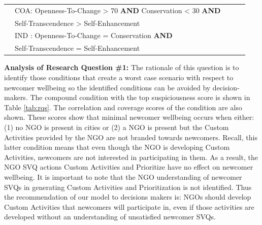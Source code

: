 \documentclass{scspaperproc}
\theoremstyle{scsthe}
\begin{document}
\begin{table}[ht]
\begin{center}
{\begin{tabular}{|l l l l l |}
                                                                      & COA: Openness-To-Change > 70 \textbf{AND} Conservation < 30 \textbf{AND} & & & \\         
                                                                      &  \hspace*{0.95cm} Self-Transcendence > Self-Enhancement  & & & \\  
                                                                      & IND : Openness-To-Change = Conservation \textbf{AND} & & & \\         
                                                                      &  \hspace*{0.95cm} Self-Transcendence = Self-Enhancement & & & \\    
\hline
\end{tabular}}
\end{center}
\end{table}
 
{\bf Analysis of Research Question \#1:} The rationale of this question is to identify those conditions that create a worst case scenario with respect to newcomer wellbeing so the identified conditions can be avoided by decision-makers. The compound condition with the top suspiciousness score is shown in Table \ref{tab:rqs}. The correlation and coverage scores of the condition are also shown. These scores show that minimal newcomer wellbeing occurs when either: (1) no NGO is present in cities or (2) a NGO is present but the Custom Activities provided by the NGO are not branded towards newcomers. Recall, this latter condition means that even though the NGO is developing Custom Activities, newcomers are not interested in participating in them. As a result, the NGO SVQ actions Custom Activities and Prioritize have no effect on newcomer wellbeing. It is important to note that the NGO understanding of newcomer SVQs in generating Custom Activities and Prioritization is not identified. Thus the recommendation of our model to decisions makers is: NGOs should develop Custom Activities that newcomers will participate in, even if those activities are developed without an understanding of unsatisfied newcomer SVQs. 
\end{document}
